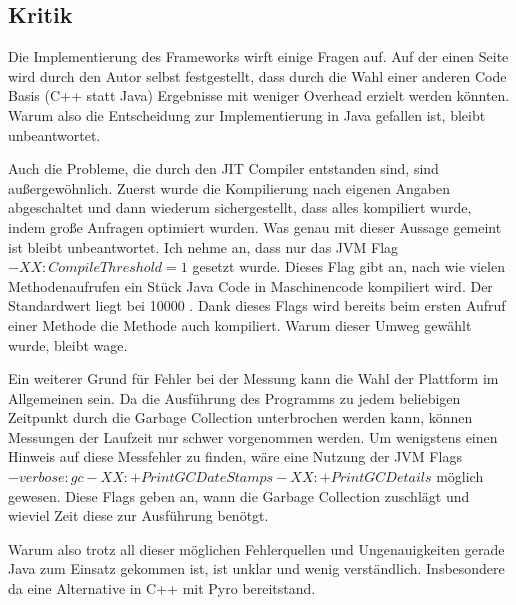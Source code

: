 \subsection{Kritik} 


Die Implementierung des Frameworks wirft einige Fragen auf. Auf der einen Seite wird durch den Autor selbst festgestellt, dass durch die Wahl einer anderen Code Basis (C++ statt Java) Ergebnisse mit weniger Overhead erzielt werden könnten. Warum also die Entscheidung zur Implementierung in Java gefallen ist, bleibt unbeantwortet.

Auch die Probleme, die durch den JIT Compiler entstanden sind, sind außergewöhnlich. Zuerst wurde die Kompilierung nach eigenen Angaben abgeschaltet und dann wiederum sichergestellt, dass alles kompiliert wurde, indem große Anfragen optimiert wurden. Was genau mit dieser Aussage gemeint ist bleibt unbeantwortet.  Ich nehme an, dass nur das JVM Flag $-XX:CompileThreshold=1$ gesetzt wurde. Dieses Flag gibt an, nach wie vielen Methodenaufrufen ein Stück Java Code in Maschinencode kompiliert wird. Der Standardwert liegt bei 10000 \cite{oracle2015VMOptions}. Dank dieses Flags wird bereits beim ersten Aufruf einer Methode die Methode auch kompiliert. Warum dieser Umweg gewählt wurde, bleibt wage.

Ein weiterer Grund für Fehler bei der Messung kann die Wahl der Plattform im Allgemeinen sein. Da die Ausführung des Programms zu jedem beliebigen Zeitpunkt durch die Garbage Collection unterbrochen werden kann, können Messungen der Laufzeit nur schwer vorgenommen werden. Um wenigstens einen Hinweis auf diese Messfehler zu finden, wäre eine Nutzung der JVM Flags $ -verbose:gc -XX:+PrintGCDateStamps -XX:+PrintGCDetails$ möglich gewesen. Diese Flags geben an, wann die Garbage Collection zuschlägt und wieviel Zeit diese zur Ausführung benötgt. \cite{andreasson2015JVM}  


Warum also trotz all dieser möglichen Fehlerquellen und Ungenauigkeiten gerade Java zum Einsatz gekommen ist, ist unklar und wenig verständlich. Insbesondere da eine Alternative in C++ mit Pyro bereitstand.


